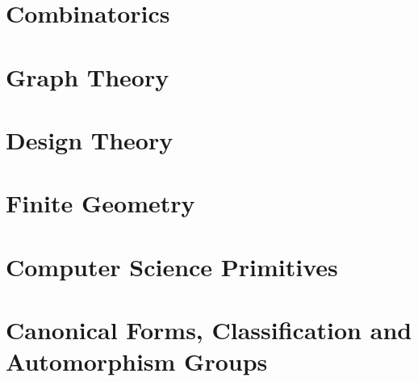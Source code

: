 \documentclass[10pt]{book}
\begin{document}
\chapter{Combinatorics}
\label{chapter:combinatorics}





\chapter{Graph Theory}
\label{chapter:graph:theory}






\chapter{Design Theory}
\label{chapter:design:theory}





\chapter{Finite Geometry}
\label{chapter:finite:geometry}






\chapter{Computer Science Primitives}
\label{chapter:computer:science:primitives}





\chapter{Canonical Forms, Classification and Automorphism Groups}
\label{chapter:canonical:forms}




\end{document}
